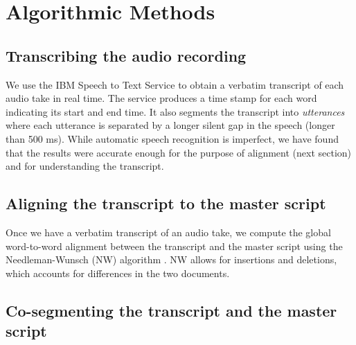 \section{Algorithmic Methods}
\label{sec:algorithms}
\subsection{Transcribing the audio recording}
We use the IBM Speech to Text Service \cite{ibmspeechtotext} to obtain a verbatim transcript of each audio take in real time. The service produces a time stamp for each word indicating its start and end time. It also segments the transcript into \textit{utterances} where each utterance is separated by a longer silent gap in the speech (longer than 500 ms). While automatic speech recognition is imperfect, we have found that the results were accurate enough for the purpose of alignment (next section) and for understanding the transcript.
  
\subsection{Aligning the transcript to the master script}
Once we have a verbatim transcript of an audio take, we compute the global word-to-word alignment between the transcript and the master script using the Needleman-Wunsch (NW) algorithm \cite{needleman1970general}. NW allows for insertions and deletions, which accounts for differences in the two documents. 

\subsection{Co-segmenting the transcript and the master script}

